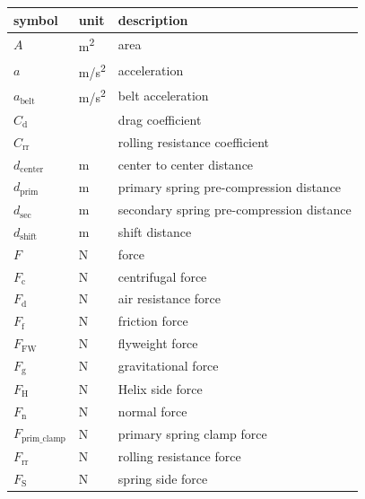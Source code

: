 \documentclass[12pt]{article}
\begin{document}
\renewcommand{\arraystretch}{1.2}
\noindent \begin{longtable*}{l l p{12cm}} \toprule
\textbf{symbol} & \textbf{unit} & \textbf{description}\\
\midrule
$A$ & \si[per-mode=symbol] {\metre\squared} & area \\
$a$ & \si[per-mode=symbol] {\metre\per\second\squared} & acceleration \\
$a_{\text{belt}}$ & \si[per-mode=symbol] {\metre\per\second\squared} & belt acceleration \\
$C_{\text{d}}$ & \si[per-mode=symbol] {} & drag coefficient \\
$C_{\text{rr}}$ & \si[per-mode=symbol] {} & rolling resistance coefficient \\
$d_{\text{center}}$ & \si[per-mode=symbol] {\metre} & center to center distance \\
$d_{\text{prim}}$ & \si[per-mode=symbol] {\metre} & primary spring pre-compression distance \\
$d_{\text{sec}}$ & \si[per-mode=symbol] {\metre} & secondary spring pre-compression distance \\
$d_{\text{shift}}$ & \si[per-mode=symbol] {\metre} & shift distance \\
$F$ & \si[per-mode=symbol] {\newton} & force \\
$F_{\text{c}}$ & \si[per-mode=symbol] {\newton} & centrifugal force \\
$F_{\text{d}}$ & \si[per-mode=symbol] {\newton} & air resistance force \\
$F_{\text{f}}$ & \si[per-mode=symbol] {\newton} & friction force \\
$F_{\text{FW}}$ & \si[per-mode=symbol] {\newton} & flyweight force \\
$F_{\text{g}}$ & \si[per-mode=symbol] {\newton} & gravitational force \\
$F_{\text{H}}$ & \si[per-mode=symbol] {\newton} & Helix side force \\
$F_{\text{n}}$ & \si[per-mode=symbol] {\newton} & normal force \\
$F_{\text{prim\_clamp}}$ & \si[per-mode=symbol] {\newton} & primary spring clamp force \\
$F_{\text{rr}}$ & \si[per-mode=symbol] {\newton} & rolling resistance force \\
$F_{\text{S}}$ & \si[per-mode=symbol] {\newton} & spring side force \\

\end{longtable*}
\end{document}
